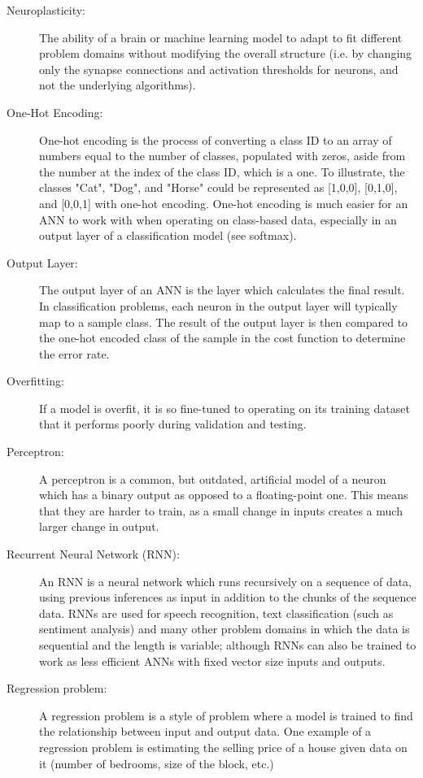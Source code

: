 \documentclass[]{report}
\begin{document}
\begin{description}
\item[Neuroplasticity:] The ability of a brain or machine learning model to adapt to fit different problem domains without modifying the overall structure (i.e. by changing only the synapse connections and activation thresholds for neurons, and not the underlying algorithms).

\item[One-Hot Encoding:] One-hot encoding is the process of converting a class ID to an array of numbers equal to the number of classes, populated with zeros, aside from the number at the index of the class ID, which is a one. To illustrate, the classes "Cat", "Dog", and "Horse" could be represented as [1,0,0], [0,1,0], and [0,0,1] with one-hot encoding. One-hot encoding is much easier for an ANN to work with when operating on class-based data, especially in an output layer of a classification model (see softmax).

\item[Output Layer:] The output layer of an ANN is the layer which calculates the final result. In classification problems, each neuron in the output layer will typically map to a sample class. The result of the output layer is then compared to the one-hot encoded class of the sample in the cost function to determine the error rate.

\item[Overfitting:] If a model is overfit, it is so fine-tuned to operating on its training dataset that it performs poorly during validation and testing.

\item[Perceptron:] A perceptron is a common, but outdated, artificial model of a neuron which has a binary output as opposed to a floating-point one. This means that they are harder to train, as a small change in inputs creates a much larger change in output.

\item[Recurrent Neural Network (RNN):] An RNN is a neural network which runs recursively on a sequence of data, using previous inferences as input in addition to the chunks of the sequence data. RNNs are used for speech recognition, text classification (such as sentiment analysis) and many other problem domains in which the data is sequential and the length is variable; although RNNs can also be trained to work as less efficient ANNs with fixed vector size inputs and outputs.

\item[Regression problem:] A regression problem is a style of problem where a model is trained to find the relationship between input and output data. One example of a regression problem is estimating the selling price of a house given data on it (number of bedrooms, size of the block, etc.)	


\end{description}
\end{document}
